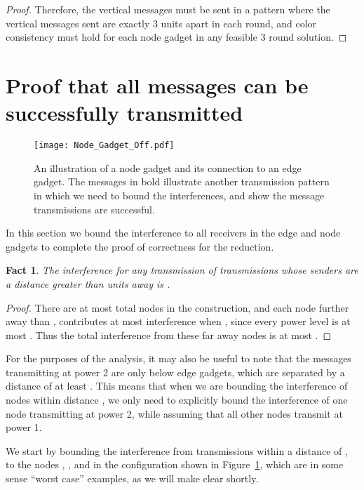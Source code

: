 \documentclass{article}
\newtheorem{fact}[lemma]{Fact}
\begin{document}
\begin{proof}
Therefore, the vertical messages must be sent in a pattern where the vertical messages sent are exactly 3 units apart in each round, and color consistency must hold for each node gadget in any feasible 3 round solution.
\end{proof}



\section{Proof that all messages can be successfully transmitted}

\begin{figure}
\begin{center}
\texttt{[image: Node\_Gadget\_Off.pdf]}
\end{center}
\caption[Node gadget]{An illustration of a node gadget and its connection to an edge gadget.  The messages in bold illustrate another transmission pattern in which we need to bound the interferences, and show the message transmissions are successful.}
\label{fig:nodegadget}
\end{figure}

In this section we bound the interference to all receivers in the edge and node gadgets to complete the proof of correctness for the reduction.

\begin{fact}
The interference for any transmission of transmissions whose senders are a distance greater than  units away is .
\end{fact}
\begin{proof}
There are at most  total nodes in the construction, and each node further away than , contributes at most  interference when , since every power level is at most .  Thus the total interference from these far away nodes is at most .
\end{proof}

For the purposes of the analysis, it may also be useful to note that the messages transmitting at power 2 are only below edge gadgets, which are separated by a distance of at least .  This means that when we are bounding the interference of nodes within distance , we only need to explicitly bound the interference of one node transmitting at power 2, while assuming that all other nodes transmit at power 1.

We start by bounding the interference from transmissions within a distance of , to the nodes , , and  in the configuration shown in Figure~\ref{fig:nodegadget}, which are in some sense ``worst case'' examples, as we will make clear shortly.
\end{document}
